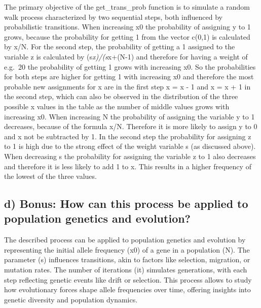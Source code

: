 \documentclass[
]{article}
\begin{document}
The primary objective of the get\_trans\_prob function is to simulate a
random walk process characterized by two sequential steps, both
influenced by probabilistic transitions. \newline When increasing x0 the
probability of assigning y to 1 grows, because the probability for
getting 1 from the vector c(0,1) is calculated by x/N. For the second
step, the probability of getting a 1 assigned to the variable z is
calculated by (s\emph{x)/(s}x+(N-1) and therefore for having a weight of
e.g.~20 the probability of getting 1 grows with increasing x0. So the
probabilities for both steps are higher for getting 1 with increasing x0
and therefore the most probable new assignments for x are in the first
step x = x - 1 and x = x + 1 in the second step, which can also be
observed in the distribution of the three possible x values in the table
as the number of middle values grows with increasing x0. \newline When
increasing N the probability of assigning the variable y to 1 decreases,
because of the formula x/N. Therefore it is more likely to assign y to 0
and x not be subtracted by 1. In the second step the probability for
assigning z to 1 is high due to the strong effect of the weight variable
s (as discussed above). \newline When decreasing s the probability for
assigning the variable z to 1 also decreases and therefore it is less
likely to add 1 to x. This results in a higher frequency of the lowest
of the three values.

\hypertarget{d-bonus-how-can-this-process-be-applied-to-population-genetics-and-evolution}{%
\subsection{d) Bonus: How can this process be applied to population
genetics and
evolution?}\label{d-bonus-how-can-this-process-be-applied-to-population-genetics-and-evolution}}

The described process can be applied to population genetics and
evolution by representing the initial allele frequency (x0) of a gene in
a population (N). The parameter (s) influences transitions, akin to
factors like selection, migration, or mutation rates. The number of
iterations (it) simulates generations, with each step reflecting genetic
events like drift or selection. This process allows to study how
evolutionary forces shape allele frequencies over time, offering
insights into genetic diversity and population dynamics.
\end{document}
